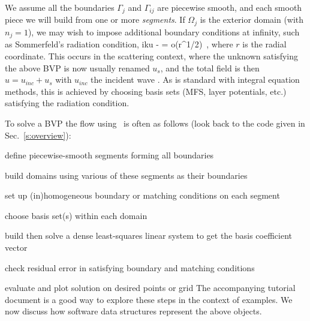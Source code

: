 \documentclass[12pt]{article}
\begin{document}
We assume all the boundaries $\Gamma_j$ and $\Gamma_{ij}$
are piecewise smooth, and each smooth piece we
will build from one or more {\em segments}.
If $\Omega_j$ is the exterior domain (with $n_j=1$), we may wish to impose
additional boundary conditions at infinity, such as Sommerfeld's
radiation condition,
\be
iku -  = o(r^{1/2})~,
\ee
where $r$ is the radial coordinate.
This occurs in the scattering context, where the unknown satisfying
the above BVP is now usually renamed $u_s$, and the total field
is then $u = u_{inc} + u_s$ with $u_{inc}$ the incident wave
\cite{coltonkress}.
As is standard with integral equation methods,
this is achieved by choosing basis sets (MFS, layer potentials, etc.)
satisfying the radiation condition.

To solve a BVP the flow using \mpspack\ is often as follows
(look back to the code given in Sec.~\ref{s:overview}):
\ben
\item define piecewise-smooth segments forming all boundaries
\item build domains using various of these segments as their boundaries
\item set up (in)homogeneous boundary or matching conditions on each segment
\item choose basis set(s) within each domain
\item build then solve a dense least-squares
linear system to get the basis coefficient vector
\item check residual error in satisfying boundary and matching conditions
\item evaluate and plot solution on desired points or grid
\een
The accompanying
tutorial document is a good way to explore these steps
in the context of examples.
We now discuss how software data structures represent the above objects.



\bfi %
\efi


\end{document}
